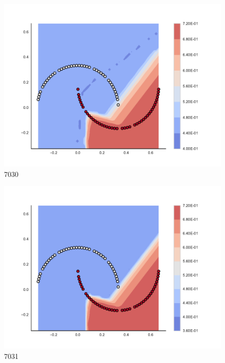 \begin{subfigure}[b]{0.09\textwidth}
    \includegraphics[clip, trim=2.35cm 1.75cm 4.5cm 0cm,width=\textwidth]{img/convergence/7030.pdf}
    \caption{7030}
    \label{fig:convergence_7030}
\end{subfigure}
%
\begin{subfigure}[b]{0.09\textwidth}
    \includegraphics[clip, trim=2.35cm 1.75cm 4.5cm 0cm,width=\textwidth]{img/convergence/7031.pdf}
    \caption{7031}
    \label{fig:convergence_7031}
\end{subfigure}
%
